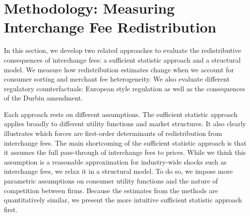 \documentclass[main.tex]{subfiles}
\begin{document}
\section{Methodology: Measuring Interchange Fee Redistribution}
\label{sec:redistribution}

In this section, we develop two related approaches to evaluate the redistributive consequences of interchange fees: a sufficient statistic approach and a structural model.
We measure how redistribution estimates change when we account for consumer sorting and merchant fee heterogeneity.
We also evaluate different regulatory counterfactuals: European style regulation as well as the consequences of the Durbin amendment.

Each approach rests on different assumptions.
The sufficient statistic approach applies broadly to different utility functions and market structures.
It also clearly illustrates which forces are first-order determinants of redistribution from interchange fees.
The main shortcoming of the sufficient statistic approach is that it assumes the full pass-through of interchange fees to prices.
While we think this assumption is a reasonable approximation for industry-wide shocks such as interchange fees, we relax it in a structural model.
To do so, we impose more parametric assumptions on consumer utility functions and the nature of competition between firms.
Because the estimates from the methods are quantitatively similar, we present the more intuitive sufficient statistic approach first.


\end{document}
